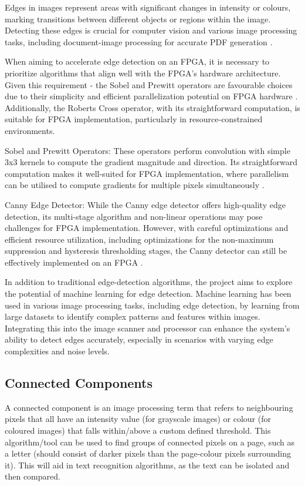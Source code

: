 \documentclass{article}
\begin{document}
Edges in images represent areas with significant changes in intensity or colours, marking transitions between different objects or 
regions within the image. Detecting these edges is crucial for computer vision and various image processing tasks, including document-image 
processing for accurate PDF generation \cite{nagalakshmi2015}. \medskip

When aiming to accelerate edge detection on an FPGA, it is necessary to prioritize algorithms that align well with the FPGA's hardware 
architecture. Given this requirement - the Sobel and Prewitt operators are favourable choices due to their simplicity and efficient 
parallelization potential on FPGA hardware \cite{6949951}. Additionally, the Roberts Cross operator, with its straightforward computation, is 
suitable for FPGA implementation, particularly in resource-constrained environments. \medskip

Sobel and Prewitt Operators: These operators perform convolution with simple 3x3 kernels to compute the gradient magnitude and direction. 
Its straightforward computation makes it well-suited for FPGA implementation, where parallelism can be utilised to compute gradients for 
multiple pixels simultaneously \cite{6949951}. \medskip

Canny Edge Detector: While the Canny edge detector offers high-quality edge detection, its multi-stage algorithm and non-linear operations 
may pose challenges for FPGA implementation. However, with careful optimizations and efficient resource utilization, including optimizations 
for the non-maximum suppression and hysteresis thresholding stages, the Canny detector can still be effectively implemented on an FPGA \cite{6774938}. \medskip

In addition to traditional edge-detection algorithms, the project aims to explore the potential of machine learning for edge detection. 
Machine learning has been used in various image processing tasks, including edge detection, by learning from large datasets to identify 
complex patterns and features within images. Integrating this into the image scanner and processor can enhance the system's ability to 
detect edges accurately, especially in scenarios with varying edge complexities and noise levels. 

\subsection*{Connected Components}
A connected component is an image processing term that refers to neighbouring pixels that all have an intensity value (for grayscale images) 
or colour (for coloured images) that falls within/above a custom defined threshold. This algorithm/tool can be used to find groups of 
connected pixels on a page, such as a letter (should consist of darker pixels than the page-colour pixels surrounding it). This will aid in text 
recognition algorithms, as the text can be isolated and then compared.
\end{document}
